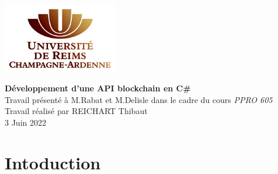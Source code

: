 \documentclass[11pt]{article}		            %
\theoremstyle{definition}                       %
\begin{document}
\thispagestyle{empty}	                        %
\begin{center}
    \includegraphics[width=5cm]{image/logo.jpg}	    %
\end{center}
\vspace{4cm}	                                %
\begin{center}	                                %
    {\huge \bf Développement d'une API blockchain en C\# }\\                        %
    \vspace{3cm}
    \large Travail présenté à M.Rabat et M.Delisle dans le cadre du cours \emph{PPRO 605} \\
    \vspace{3cm}
    Travail réalisé par REICHART Thibaut\\
    \vfill	                                    %
    3 Juin 2022
\end{center}
\newpage
\tableofcontents
    \section{Intoduction}
    
\end{document}
